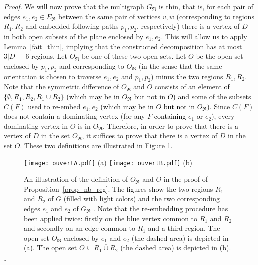 \documentclass[a4paper,11pt]{article}
\newcommand{\rlem}   [1] {Lemma~\ref{#1}\xspace}
\newenvironment{proof}{\noindent \textit{Proof. }}{\hfill$\square$\vspace{.2cm}}
\newcommand{\add}   [1] {\textcolor{red} {#1}}
\newcommand{\addOK}   [1] {\textcolor{black} {#1}}
\newcommand{\modif} [2] {\add{#2}}
\newcommand{\modifOK} [2] {\addOK{#2}}
\newcommand{\ig}[1]{\textcolor{blue}{\fbox{\fbox{\textcolor{blue}{#1}}}}}
\begin{document}
\begin{proof}
We will now prove that the multigraph $G_\Re$ is thin, that is, for each pair of edges $e_1,e_2 \in E_\Re$ between the same pair of vertices $v,w$ (corresponding to regions $R_1,R_2$ and embedded following  paths $p_1,p_2$, respectively) there is a vertex of $D$ in both open subsets of the plane enclosed by $e_1,e_2$. This will allow us to apply \rlem{fait_thin}, implying that the constructed decomposition has at most $3 |D| - 6$ regions. Let $O_\Re$ be one of these two open sets.
Let $O$ be the open set enclosed by $p_1,p_2$ and corresponding to $O_\Re$ (in the sense that the same orientation is chosen to traverse $e_1,e_2$ and $p_1,p_2$) minus the two regions $R_1,R_2$.
Note that the symmetric difference of $O_\Re$ and $O$ consists of \modifOK{some of the two regions \ig{tu veux dire toute une r\'egion, ou juste une partie d'une des r\'egions?}}{an element of $\{ \emptyset, R_1, R_2, R_1\cup R_2 \}$ (which may be in $O_\Re$ but not in $O$)}  and some of the subsets $C(F)$ used to re-embed $e_1,e_2$ \modifOK{}{(which may be in $O$ but not in $O_\Re$)}. Since $C(F)$ does not contain a dominating vertex (for any \modifOK{$F \in \mathcal{F}_{e_1,e_2}$}{$F$ containing $e_1$ or $e_2$}), every dominating vertex in $O$ is in \modifOK{$O'$ \ig{on n'a pas d\'efinit $O'$}}{$O_\Re$}. \modifOK{And since $O'$ is a subset of $O_\Re$, every dominating vertex in $O$ is in $O_\Re$.}{}Therefore, in order to prove that there is a vertex of $D$ in the set $O_\Re$, it suffices to prove that there is a vertex of $D$ in the set $O$.
These two definitions are illustrated in Figure \ref{fig_ouvert}.

\begin{figure}[h]
\begin{center}
\texttt{[image: ouvertA.pdf]} (a)
   \texttt{[image: ouvertB.pdf]} (b)
\end{center}
   \caption{An illustration of the definition of $O_\Re$\modif{$, O'$,}{} and $O$ in the proof of Proposition~\ref{prop_nb_reg}. The \modifOK{}{figures show the} two regions $R_1$ and $R_2$ of $G$ (filled with light colors) and the two corresponding edges $e_1$ and $e_2$ of $G_\Re$ \modif{are depicted in (a)}{}. Note that the re-embedding procedure has been applied twice: firstly on the blue vertex common to $R_1$ and $R_2$ and secondly on an edge common to $R_1$ and a third region. The open set $O_\Re$ enclosed by $e_1$ and $e_2$ (the \modifOK{dark}{dashed} area) is depicted in \modifOK{(b)}{(a)}.\modif{The open set $O'$ (the dark area) is depicted in (c). Finally,}{} The open set $O \subseteq \overline{R_1 \cup R_2}$ (the \modifOK{dark}{dashed} area) is depicted in \modifOK{(d)}{(b)}. }
   \label{fig_ouvert}
\end{figure}


\end{proof}
\end{document}
